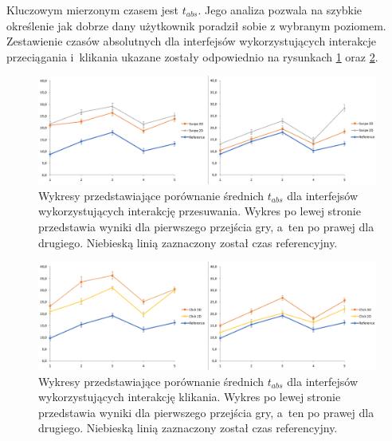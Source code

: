 \documentclass[a4paper,12pt,numbers=noenddot]{report}
\begin{document}
Kluczowym mierzonym czasem jest $t_{abs}$. Jego analiza pozwala na szybkie określenie jak dobrze dany użytkownik poradził sobie z wybranym poziomem. Zestawienie czasów absolutnych dla interfejsów wykorzystujących interakcje przeciągania i~klikania ukazane zostały odpowiednio na rysunkach \ref{fig:diag:tAbs_Swipe12} oraz \ref{fig:diag:tAbs_Click12}.

\begin{figure}[h!]
	\centering
  	\includegraphics[width=\linewidth]{diag/tAbs_Swipe12.png}
	\caption{Wykresy przedstawiające porównanie średnich $t_{abs}$ dla interfejsów wykorzystujących interakcję przesuwania. Wykres po lewej stronie przedstawia wyniki dla pierwszego przejścia gry, a~ten po prawej dla drugiego. Niebieską linią zaznaczony został czas referencyjny.}
	\label{fig:diag:tAbs_Swipe12}
\end{figure}

\begin{figure}[h!]
	\centering
  	\includegraphics[width=\linewidth]{diag/tAbs_Click12.png}
	\caption{Wykresy przedstawiające porównanie średnich $t_{abs}$ dla interfejsów wykorzystujących interakcję klikania. Wykres po lewej stronie przedstawia wyniki dla pierwszego przejścia gry, a~ten po prawej dla drugiego. Niebieską linią zaznaczony został czas referencyjny.}
	\label{fig:diag:tAbs_Click12}
\end{figure}
\end{document}
